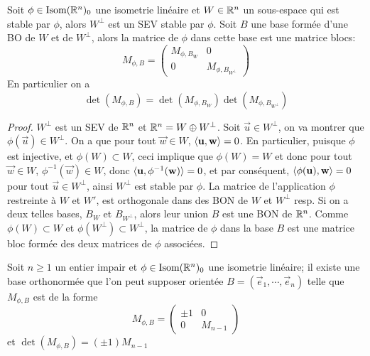 \begin{theorem}
	Soit $\phi \in \operatorname{Isom}(\mathbb{R}^n)_0$ une isometrie linéaire et $W \in \mathbb{R}^n$ un
	sous-espace qui est stable par $\phi$, alors $W^\perp$ est un SEV stable par
	$\phi$. Soit $B$ une base formée d'une BO de $W$ et de $W^\perp$, alors la
	matrice de $\phi$ dans cette base est une matrice blocs:
	\begin{equation*}
		M_{\phi, B} = 
		\begin{pmatrix}
			M_{\phi, B_W} & 0 \\
			0 & M_{\phi, B_{W^\perp}}
			
		\end{pmatrix}
	\end{equation*}
	En particulier on a
	\begin{equation*}
		\det(M_{\phi, B}) = \det(M_{\phi, B_W})\det(M_{\phi, B_{W^\perp}})
	\end{equation*}
\end{theorem}

\begin{proof}
	$W^\perp$ est un SEV de $\mathbb{R}^n$ et $\mathbb{R}^n = W\oplus W^\perp$. Soit $\vec{u} \in
	W^\perp$, on va montrer que $\phi(\vec{u}) \in W^\perp$.  On a que pour tout
	$\vec{w} \in W$, $\langle \mathbf{u}, \mathbf{w} \rangle = 0$. En particulier, puisque
	$\phi$ est injective, et $\phi(W) \subset W$, ceci implique que $\phi(W) = W$
	et donc pour tout $\vec{w} \in W$, $\phi^{-1}(\vec{w}) \in W$, donc
	$\langle \mathbf{u}, \phi^{-1}(\mathbf{w}) \rangle = 0$, et par conséquent,
	$\langle \phi(\mathbf{u}), \mathbf{w} \rangle = 0$ pour tout $\vec{u} \in W^\perp$, ainsi
	$W^\perp$ est stable par $\phi$.  La matrice de l'application $\phi$
	restreinte à $W$ et $W'$, est orthogonale dans des BON de $W$ et $W^\perp$
	resp. Si on a deux telles bases, $B_W$ et $B_{W^\perp}$, alors leur union $B$
	est une BON de $\mathbb{R}^n$. Comme $\phi(W) \subset W$ et $\phi(W^\perp) \subset
	W^\perp$, la matrice de $\phi$ dans la base $B$ est une matrice bloc formée
	des deux matrices de $\phi$ associées.
\end{proof}

\begin{theorem}
	Soit $n \geq 1$ un entier impair et $\phi \in \operatorname{Isom}(\mathbb{R}^n)_0$ une isometrie
	linéaire; il existe une base orthonormée que l'on peut supposer orientée
	$B = (\vec{e}_1, \cdots, \vec{e}_n)$ telle que $M_{\phi, B}$ est de la forme
	\begin{equation*}
		M_{\phi, B} =
		\begin{pmatrix}
			\pm 1 & 0 \\
			0 & M_{n-1}
		\end{pmatrix}
	\end{equation*}
	et $\det(M_{\phi, B}) = (\pm 1) M_{n-1}$
\end{theorem}


